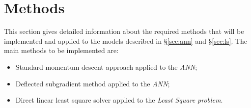 \section{Methods}
This section gives detailed information about the required methods that will be implemented and applied to the models described in \S\ref{sec:ann} and \S\ref{sec:ls}. The main methods to be implemented are:
\begin{itemize}
    \item Standard momentum descent approach applied to the \textit{ANN};
    \item Deflected subgradient method applied to the \textit{ANN};
    \item Direct linear least square solver applied to the \textit{Least Square problem}.
\end{itemize}


% 
